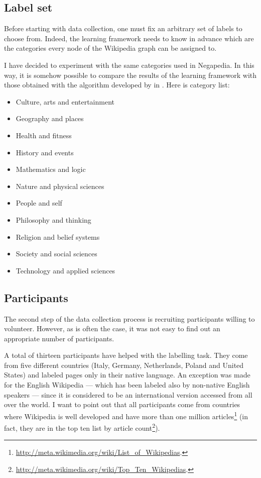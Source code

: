         \subsection{Label set}
            Before starting with data collection, one must fix an arbitrary set of labels to choose from. Indeed, the learning framework needs to know in advance which are the categories every node of the Wikipedia graph can be assigned to.
            
            I have decided to experiment with the same categories used in Negapedia. In this way, it is somehow possible to compare the results of the learning framework with those obtained with the algorithm developed by \citeauthor{Bonetti} in \cite{Bonetti}. Here is category list:
            \begin{multicols}{2}
                \begin{itemize}
                    \item Culture, arts and entertainment
                    \item Geography and places
                    \item Health and fitness
                    \item History and events
                    \item Mathematics and logic
                    \item Nature and physical sciences
                    \item People and self
                    \item Philosophy and thinking
                    \item Religion and belief systems
                    \item Society and social sciences
                    \item Technology and applied sciences
                \end{itemize}
            \end{multicols}
        \subsection{Participants}\label{participants}
            The second step of the data collection process is recruiting participants willing to volunteer. However, as is often the case, it was not easy to find out an appropriate number of participants.
            
            A total of thirteen participants have helped with the labelling task. They come from five different countries (Italy, Germany, Netherlands, Poland and United States) and labeled pages only in their native language. An exception was made for the English Wikipedia --- which has been labeled also by non-native English speakers --- since it is considered to be an international version accessed from all over the world. I want to point out that all participants come from countries where Wikipedia is well developed and have more than one million articles\footnote{\url{http://meta.wikimedia.org/wiki/List_of_Wikipedias}.} (in fact, they are in the top ten list by article count\footnote{\url{http://meta.wikimedia.org/wiki/Top_Ten_Wikipedias}.}).
            
